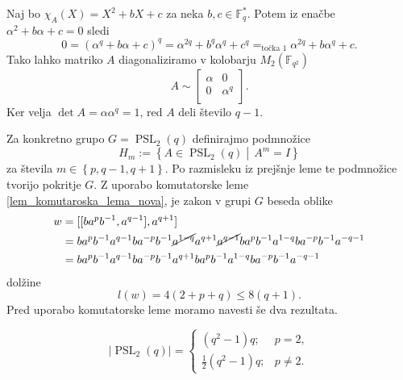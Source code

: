 \begin{dokaz}
\begin{enumerate}
    Naj bo $\chi_A(X) = X^2 + bX + c$ za neka $b ,c \in \mathbb{F}_q^{*}$. Potem iz enačbe $\alpha^2 + b \alpha + c  = 0$ sledi \begin{equation*}
    0 = (\alpha^{q} + b \alpha + c)^q =  \alpha^{2q} + b^{q} \alpha^{q} + c^{q} =_\text{točka 1} \alpha^{2q} + b \alpha^{q} + c.    
    \end{equation*}  
    Tako lahko matriko $A$ diagonaliziramo v kolobarju $M_2(\mathbb{F}_{q^2})$ \begin{equation*}
    A \sim  \begin{bmatrix}
        \alpha & 0\\
        0 & \alpha^{q}\\
    \end{bmatrix}.
    \end{equation*}  
    Ker velja $\det A = \alpha \alpha^{q} = 1$, red $A$ deli število $q-1$.
    \end{enumerate}   
\end{dokaz}
    Za konkretno grupo $G = \operatorname{PSL}_2(q)$ definirajmo podmnožice \begin{equation*}
        H_m := \left\{ A \in \operatorname{PSL}_2(q)  \middle|\,  A^{m} = I \right\}
    \end{equation*}  
       za števila $m \in \left\{ p, q-1 , q+1\right\}$.
    Po razmisleku iz prejšnje leme te podmnožice tvorijo pokritje $G$. Z uporabo komutatorske leme \ref{lem_komutaroska_lema_nova}, je zakon v grupi $G$ beseda oblike \begin{align*}
        w &= [[b a^{p} b^{-1}, a^{q-1}], a^{q + 1}]  \\
         &= b a^{p} b^{-1} a^{q-1} b a^{-p} b^{-1} \cancel{ a^{1 - q}} a^{q + 1} \cancel{a^{q -1}} b a^{p} b^{-1} a^{1 - q} b a^{-p} b^{-1} a^{- q - 1} \\ 
         &= b a^{p} b^{-1} a^{q-1} b a^{-p} b^{-1}  a^{q + 1}  b a^{p} b^{-1} a^{1 - q} b a^{-p} b^{-1} a^{- q - 1} 
    \end{align*}  
    dolžine \begin{equation*} 
    l(w) = 4(2 + p + q) \le 8(q + 1). 
    \end{equation*}
    Pred uporabo komutatorske leme moramo navesti še dva rezultata.
    \begin{lema}
    \label{lem_velikost_grupe_psl2q}
    \begin{equation*}
        \lvert \operatorname{PSL}_2(q) \rvert   = \begin{cases}
            (q^2 - 1) q; & p = 2,  \\
            \frac{1}{2} (q^2 - 1) q ; & p \neq 2.
        \end{cases}
     \end{equation*} 
    \end{lema}
